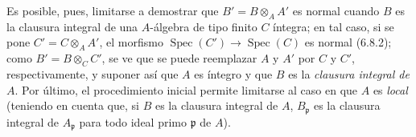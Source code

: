 Es posible, pues, limitarse a demostrar que
$B'=B\otimes_A A'$ es normal cuando $B$ es
la clausura integral de una
$A$-álgebra de tipo finito $C$ íntegra; en tal caso,
si se pone $C'=C\otimes_A A'$, el morfismo
$\operatorname{Spec}(C')\to\operatorname{Spec}(C)$ es normal (6.8.2);
como $B'=B\otimes_C C'$, se ve que se puede reemplazar $A$ y $A'$ por
$C$ y $C'$, respectivamente, y suponer así que $A$ es íntegro y que $B$ es la \emph{clausura integral de} $A$. Por último, el
procedimiento inicial permite limitarse al caso en que $A$ es \emph{local}
(teniendo en cuenta que, si $B$ es la clausura integral de $A$,
$B_\mathfrak p$ es la clausura integral de $A_\mathfrak p$ para todo
ideal primo $\mathfrak p$ de $A$).
